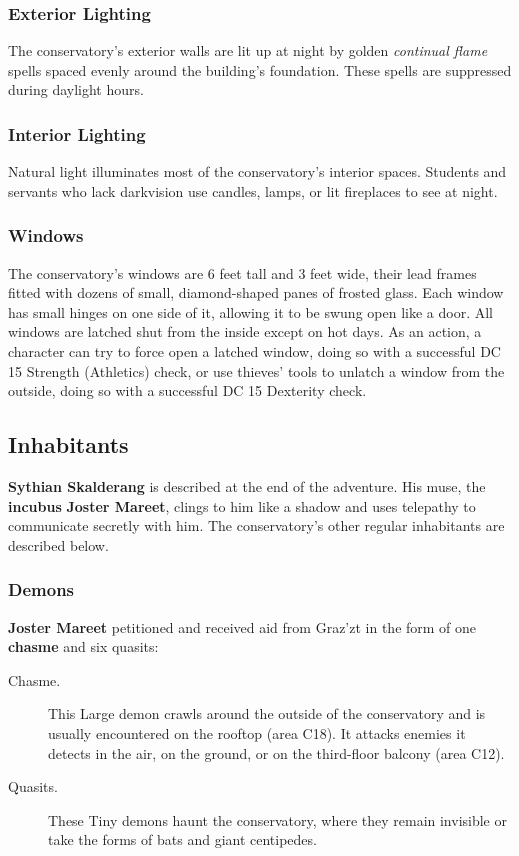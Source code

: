 \documentclass[10pt,a4paper,twoside,bg=print,twocolumn,openany,nodeprecatedcode]{dndbook}
\begin{document}
\subsubsection{Exterior Lighting}
The conservatory's exterior walls are lit up at night by golden \textit{continual flame} spells spaced evenly around the building's foundation. These spells are suppressed during daylight hours.

\subsubsection{Interior Lighting}
Natural light illuminates most of the conservatory's interior spaces. Students and servants who lack darkvision use candles, lamps, or lit fireplaces to see at night.

\subsubsection{Windows}
The conservatory's windows are 6 feet tall and 3 feet wide, their lead frames fitted with dozens of small, diamond-shaped panes of frosted glass. Each window has small hinges on one side of it, allowing it to be swung open like a door. All windows are latched shut from the inside except on hot days. As an action, a character can try to force open a latched window, doing so with a successful DC 15 Strength (Athletics) check, or use thieves' tools to unlatch a window from the outside, doing so with a successful DC 15 Dexterity check.

\subsection{Inhabitants}
\textbf{Sythian Skalderang} is described at the end of the adventure. His muse, the \textbf{incubus} \textbf{Joster Mareet}, clings to him like a shadow and uses telepathy to communicate secretly with him. The conservatory's other regular inhabitants are described below.

\subsubsection{Demons}
\textbf{Joster Mareet} petitioned and received aid from Graz'zt in the form of one \textbf{chasme} and six quasits:


\begin{description}
\item[Chasme.]
This Large demon crawls around the outside of the conservatory and is usually encountered on the rooftop (area C18). It attacks enemies it detects in the air, on the ground, or on the third-floor balcony (area C12).
\item[Quasits.]
These Tiny demons haunt the conservatory, where they remain invisible or take the forms of bats and giant centipedes.
\end{description}
\end{document}
